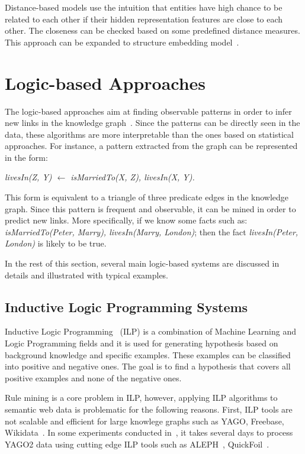 Distance-based models use the intuition that entities have high chance to be related to each other if their hidden representation features are close to each other. The closeness can be checked based on some predefined distance measures. This approach can be expanded to structure embedding model~\cite{ref8}.

\section{Logic-based Approaches}

The logic-based approaches aim at finding observable patterns in order to infer new links in the knowledge graph~\cite{ref1}. Since the patterns can be directly seen in the data, these algorithms are more interpretable than the ones based on statistical approaches. For instance, a pattern extracted from the graph can be represented in the form:\\

\centerline{\textit{livesIn(Z, Y) $\leftarrow$ isMarriedTo(X, Z), livesIn(X, Y).}}

This form is equivalent to a triangle of three predicate edges in the knowledge graph. Since this pattern is frequent and observable, it can be mined in order to predict new links. More specifically, if we know some facts such as: \textit{isMarriedTo(Peter, Marry), livesIn(Marry, London)}; then the fact \textit{livesIn(Peter, London)} is likely to be true.

In the rest of this section, several main logic-based systems are discussed in details and illustrated with typical examples.

\subsection{Inductive Logic Programming Systems}

Inductive Logic Programming~\cite{ref9} (ILP) is a combination of Machine Learning and Logic Programming fields and it is used for generating hypothesis based on background knowledge and specific examples. These examples can be classified into positive and negative ones. The goal is to find a hypothesis that covers all positive examples and none of the negative ones.

Rule mining is a core problem in ILP, however, applying ILP algorithms to semantic web data is problematic for the following reasons. First, ILP tools are not scalable and efficient for large knowlege graphs such as YAGO, Freebase, Wikidata~\cite{ref10}. In some experiments conducted in~\cite{ref10}, it takes several days to process YAGO2 data using cutting edge ILP tools such as ALEPH~\cite{ref14, ref10}, QuickFoil~\cite{ref15, ref10}.

